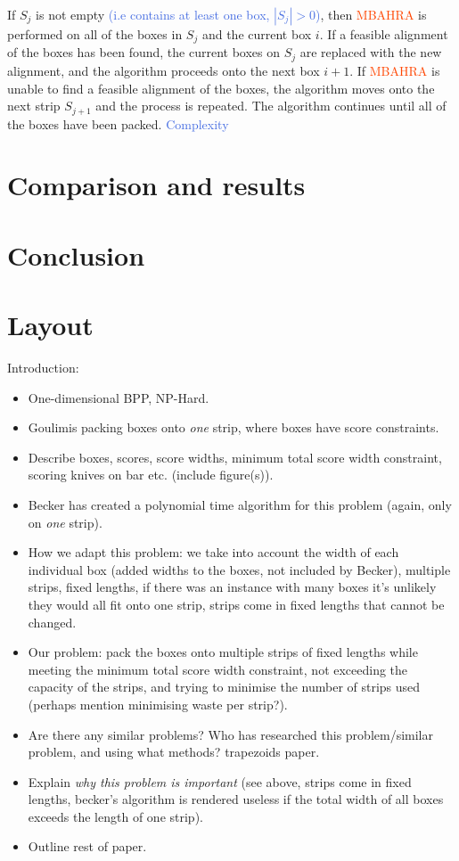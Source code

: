 \documentclass[oribibl]{llncs}
\begin{document}
If $S_j$ is not empty \textcolor{RoyalBlue}{(i.e contains at least one box, $|S_j| > 0$)}, then \textcolor{OrangeRed}{MBAHRA} is performed on all of the boxes in $S_j$ and the current box $i$. If a feasible alignment of the boxes has been found, the current boxes on $S_j$ are replaced with the new alignment, and the algorithm proceeds onto the next box $i+1$. If \textcolor{OrangeRed}{MBAHRA} is unable to find a feasible alignment of the boxes, the algorithm moves onto the next strip $S_{j+1}$ and the process is repeated. The algorithm continues until all of the boxes have been packed. \textcolor{RoyalBlue}{Complexity}




\section{Comparison and results}

\section{Conclusion}


\section{Layout}
Introduction:
\begin{itemize}
	\item One-dimensional BPP, NP-Hard.
	\item Goulimis packing boxes onto \textit{one} strip, where boxes have score constraints.
	\item Describe boxes, scores, score widths, minimum total score width constraint, scoring knives on bar etc. (include figure(s)).
	\item Becker has created a polynomial time algorithm for this problem (again, only on \textit{one} strip).
	\item How we adapt this problem: we take into account the width of each individual box (added widths to the boxes, not included by Becker), multiple strips, fixed lengths, if there was an instance with many boxes it's unlikely they would all fit onto one strip, strips come in fixed lengths that cannot be changed.
	\item Our problem: pack the boxes onto multiple strips of fixed lengths while meeting the minimum total score width constraint, not exceeding the capacity of the strips, and trying to minimise the number of strips used (perhaps mention minimising waste per strip?).
	\item Are there any similar problems? Who has researched this problem/similar problem, and using what methods? \cite{lewis2017} trapezoids paper. 
	\item Explain \textit{why this problem is important} (see above, strips come in fixed lengths, becker's algorithm is rendered useless if the total width of all boxes exceeds the length of one strip).
	\item Outline rest of paper.	
\end{itemize}
\end{document}
